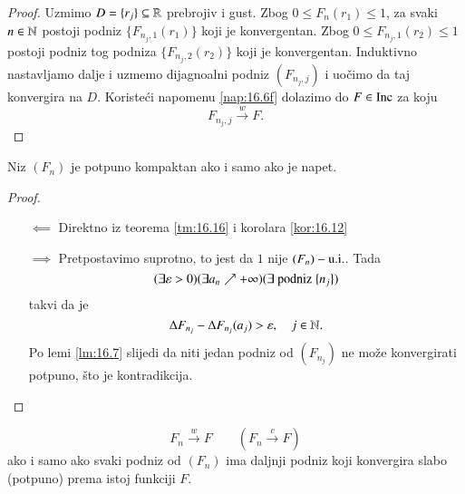 \begin{proof}
    Uzmimo $D = \{r_j\} \subseteq \mathbb{R}$ prebrojiv i gust.
    Zbog $0 \leq F_n (r_1) \leq 1$, za svaki $n \in \mathbb{N}$ postoji podniz $\{ F_{n_j, 1} (r_1) \}$ koji je konvergentan.
    Zbog $0 \leq F_{n_j, 1 } (r_2) \leq 1$ postoji podniz tog podniza $\{ F_{n_j, 2} (r_2) \}$ koji je konvergentan.
    Induktivno nastavljamo dalje i uzmemo dijagnoalni podniz $(F_{n_j, j})$ i uo\v cimo da taj konvergira na $D$.
    Koriste\' ci napomenu \ref{nap:16.6f} dolazimo do $F \in \mathrm{Inc}$ za koju
    \begin{equation*}
        F_{n_j, j} \xrightarrow{w} F.
    \end{equation*} 
\end{proof}

\begin{kor} \label{kor:16.17}
    Niz $(F_n)$ je potpuno kompaktan ako i samo ako je napet.
\end{kor}

\begin{proof}
    \begin{itemize}
        \item[$\impliedby$]
        Direktno iz teorema \ref{tm:16.16} i korolara \ref{kor:16.12}
        \item[$\implies$]
        Pretpostavimo suprotno, to jest da $1$ nije $(F_n)-\mathrm{u.i.}$.
        Tada
        \begin{equation*}
            (\exists \varepsilon > 0) (\exists a_n \nearrow + \infty) (\exists \textnormal{ podniz } \{n_j\})
        \end{equation*}
        takvi da je
        \begin{equation*}
            \Delta F_{n_j} - \Delta F_{n_j} (a_j) > \varepsilon, \quad j \in \mathbb{N}.
        \end{equation*}
        Po lemi \ref{lm:16.7} slijedi da niti jedan podniz od $(F_{n_j})$ ne mo\v ze konvergirati potpuno, \v sto je kontradikcija.
    \end{itemize}    
\end{proof}

\begin{zad} \label{zad:16.18}
    \begin{equation*}
        F_n \xrightarrow{w} F \quad \quad (F_n \xrightarrow{c} F)
    \end{equation*}
    ako i samo ako svaki podniz od $(F_n)$ ima daljnji podniz koji konvergira slabo (potpuno) prema istoj funkciji $F$.
\end{zad}